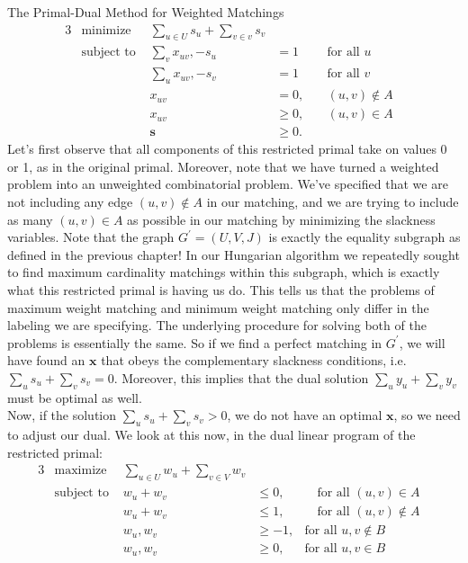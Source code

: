 \begin{section}{The Primal-Dual Method for Weighted Matchings}
\begin{alignat}{3}
		& \text{minimize } & \sum_{u\in U} s_u + \sum_{v\in v} s_v & \\
		& \text{subject to } & \sum_v x_{uv}, - s_u & = 1 & \quad \text{for all } u & \\
				     && \sum_u x_{uv}, - s_v & = 1 & \quad \text{for all } v & \\
				     && x_{uv} & = 0, & \quad (u,v)\notin A \\
				     && x_{uv} & \geq 0, & \quad (u,v)\in A \\
				     && \mathbf{s} & \geq 0.
	\end{alignat}
	Let's first observe that all components of this restricted primal take on values 0 or 1, as 
	in the original primal. Moreover, note that we have turned a weighted problem into an 
	unweighted combinatorial problem. We've specified that we are not including any edge 
	$(u,v)\notin A$ in our matching, and we are trying to include as many $(u,v)\in A$ as possible 
	in our matching by minimizing the slackness variables. Note that the graph $G^{'} = (U,V,J)$ 
	is exactly the equality subgraph as defined in the previous chapter! In our Hungarian algorithm 
	we repeatedly sought to find maximum cardinality matchings within this subgraph, which is 
	exactly what this restricted primal is having us do. This tells us that the problems of maximum 
	weight matching and minimum weight matching only differ in the labeling we are specifying. The 
	underlying procedure for solving both of the problems is essentially the same. So if we find a 
	perfect matching in $G^{'}$, we will have found an $\mathbf{x}$ that obeys the complementary 
	slackness conditions, i.e. $\sum_u s_u + \sum_v s_v = 0$. Moreover, this implies that the 
	dual solution $\sum_u y_u + \sum_v y_v$ must be optimal as well.\\
	Now, if the solution $\sum_u s_u + \sum_v s_v > 0$, we do not have an optimal $\mathbf{x}$, 
	so we need to adjust our dual. We look at this now, in the dual linear program of the 
	restricted primal:
	\begin{alignat}{3}
		& \text{maximize } & \sum_{u\in U} w_u + \sum_{v\in V} w_v & \\
		& \text{subject to } & w_u + w_v & \leq 0, & \quad \text{for all } (u,v)\in A & \\
				     && w_u + w_v & \leq 1, & \quad \text{for all } (u,v)\notin A & \\
				     && w_u,w_v & \geq -1, & \text{for all } u,v\notin B \\
				     && w_u,w_v & \geq 0, & \text{for all } u,v\in B \\

\end{alignat}
\end{section}
